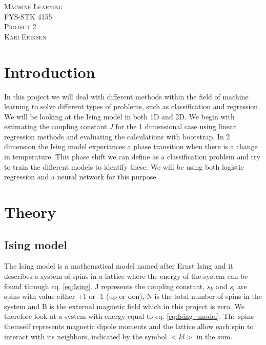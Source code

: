 \documentclass[a4paper,12pt, english]{article}
\begin{document}
\begin{titlepage}
\begin{center}
\textsc{\Large Machine Learning}\\[0.2cm]
\textsc{FYS-STK 4155}\\[1.0cm]
\textsc{\Large Project 2}\\[0.2cm]
\textsc{Kari Eriksen}\\[1.0cm]

\begin{abstract}

\end{abstract}

\end{center}
\end{titlepage}

\tableofcontents

\newpage

\section{Introduction}

In this project we will deal with different methods within the field of machine learning to solve different types of problems, such as classification and regression. We will be looking at the Ising model in both 1D and 2D. We begin with estimating the coupling constant $J$ for the 1 dimensional case using linear regression methods and evaluating the calculations with bootstrap. In 2 dimension the Ising model experiances a phase transition when there is a change in temperature. This phase shift we can define as a classification problem and try to train the different models to identify these. We will be using both logistic regression and a neural network for this purpose. 



\section{Theory}

\subsection{Ising model}

The Ising model is a mathematical model named after Ernst Ising and it describes a system of spins in a lattice where the energy of the system can be found through eq. \ref{eq:Ising}. J represents the coupling constant, $s_k$ and $s_l$ are spins with value either +1 or -1 (up or don), N is the total number of spins in the system and B is the external magnetic field which in this project is zero. We therefore look at a system with energy equal to eq. \ref{eq:Ising_model}. 
The spins themself represents magnetic dipole moments and the lattice allow each spin to interact with its neighbors, indicated by the symbol $<kl>$ in the sum. 
\end{document}
